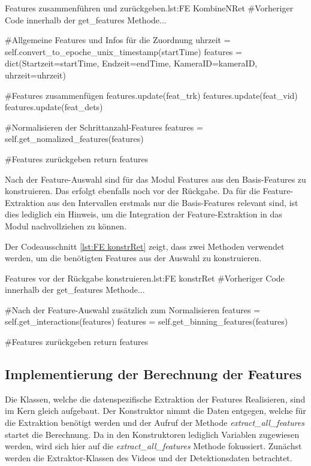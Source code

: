 \begin{pythoncode}{Features zusammenführen und zurückgeben.}{lst:FE KombineNRet}
#Vorheriger Code innerhalb der get_features Methode...

#Allgemeine Features und Infos für die Zuordnung
uhrzeit = self.convert_to_epoche_unix_timestamp(startTime)
features = dict(Startzeit=startTime, 
                Endzeit=endTime, 
                KameraID=kameraID, 
                uhrzeit=uhrzeit)

#Features zusammenfügen
features.update(feat_trk)
features.update(feat_vid)
features.update(feat_dets)

#Normalisieren der Schrittanzahl-Features 
features = self.get_nomalized_features(features)

#Features zurückgeben
return features
\end{pythoncode}

Nach der Feature-Auswahl sind für das Modul Features aus den Basis-Features zu konstruieren. Das erfolgt ebenfalls noch vor der Rückgabe. Da für die Feature-Extraktion aus den Intervallen erstmals nur die Basis-Features relevant sind, ist dies lediglich ein Hinweis, um die Integration der Feature-Extraktion in das Modul nachvollziehen zu können. \par

Der Codeausschnitt \ref{lst:FE konstrRet} zeigt, dass zwei Methoden verwendet werden, um die benötigten Features aus der Auswahl zu konstruieren. 

\begin{pythoncode}{Features vor der Rückgabe konstruieren.}{lst:FE konstrRet}
#Vorheriger Code innerhalb der get_features Methode...

#Nach der Feature-Auswahl zusätzlich zum Normalisieren
features = self.get_interactions(features)
features = self.get_binning_features(features)

#Features zurückgeben
return features
\end{pythoncode}



\subsection{Implementierung der Berechnung der Features} \label{sec:Umsetz SubExtrak}

Die Klassen, welche die datenspezifische Extraktion der Features Realisieren, sind im Kern gleich aufgebaut. Der Konstruktor nimmt die Daten entgegen, welche für die Extraktion benötigt werden und der Aufruf der Methode \textit{extract\_all\_features} startet die Berechnung. Da in den Konstruktoren lediglich Variablen zugewiesen werden, wird sich hier auf die \textit{extract\_all\_features} Methode fokussiert. Zunächst werden die Extraktor-Klassen des Videos und der Detektionsdaten betrachtet. \dubpar

